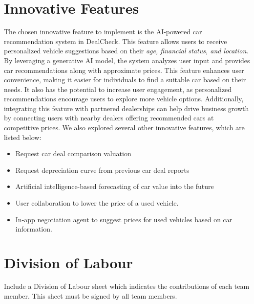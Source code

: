 \documentclass[]{article}
\begin{document}
\section{Innovative Features}
\label{sec:innovative_features}
The chosen innovative feature to implement is the AI-powered car recommendation system in DealCheck. This feature allows users to receive personalized vehicle suggestions based on their \textit{age, financial status, and location}. By leveraging a generative AI model, the system analyzes user input and provides car recommendations along with approximate prices. This feature enhances user convenience, making it easier for individuals to find a suitable car based on their needs. It also has the potential to increase user engagement, as personalized recommendations encourage users to explore more vehicle options. Additionally, integrating this feature with partnered dealerships can help drive business growth by connecting users with nearby dealers offering recommended cars at competitive prices. We also explored several other innovative features, which are listed below:
\begin{itemize}
    \item Request car deal comparison valuation
    \item Request depreciation curve from previous car deal reports
    \item Artificial intelligence-based forecasting of car value into the future
    \item User collaboration to lower the price of a used vehicle.
    \item In-app negotiation agent to suggest prices for used vehicles based on car information.
\end{itemize}

\appendix
\section{Division of Labour}
\label{sec:division_of_labour}
Include a Division of Labour sheet which indicates the contributions of each team member. This sheet must be signed by all team members.
\end{document}
